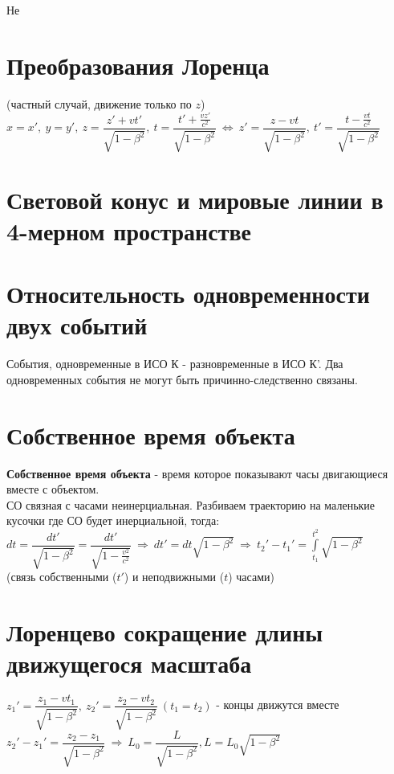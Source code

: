 \begin{multicols*}{2}
		Не
		
		\section{Преобразования Лоренца}
		
		(частный случай, движение только по $ z $) \\ 
		$ x=x',~ y=y',~ z=\dfrac{z'+vt'}{\sqrt{1-\beta^2}},~ t=\dfrac{t'+\frac{vz'}{c^2}}{\sqrt{1-\beta^2}}~\Leftrightarrow~ z'=\dfrac{z-vt}{\sqrt{1-\beta^2}},~ t'=\dfrac{t-\frac{vt}{c^2}}{\sqrt{1-\beta^2}} $
		
		\section{Световой конус и мировые линии в 4-мерном пространстве}
		
		\section{Относительность одновременности двух событий}
		
		События, одновременные в ИСО К - разновременные в ИСО К'. Два одновременных события не могут быть причинно-следственно связаны.
		
		\section{Собственное время объекта}
		
		\textbf{Собственное время объекта} - время которое показывают часы двигающиеся вместе с объектом. \\
		СО  связная с часами неинерциальная. Разбиваем траекторию на маленькие кусочки где СО будет инерциальной, тогда: \\
		$ dt=\dfrac{dt'}{\sqrt{1-\beta^2}} = \dfrac{dt'}{\sqrt{1-\frac{v^2}{c^2}}} ~\Rightarrow~ dt'=dt\sqrt{1-\beta^2} ~\Rightarrow~ t_2'-t_1' = \int\limits_{t_1}^{t^2}\sqrt{1-\beta^2} $ \\
		(связь собственными ($ t' $) и неподвижными ($ t  $) часами)
		
		\section{Лоренцево сокращение длины движущегося масштаба}
		
		$ z_1'= \dfrac{z_1-vt_1}{\sqrt{1-\beta^2}},~ z_2'= \dfrac{z_2-vt_2}{\sqrt{1-\beta^2}} ~ (t_1=t_2)$ - концы движутся вместе \\
		$ z_2'-z_1' = \dfrac{z_2-z_1}{\sqrt{1-\beta^2}} ~ \Rightarrow ~ L_0 = \dfrac{L}{\sqrt{1-\beta^2}}, L = L_0\sqrt{1-\beta^2} $
		

\end{multicols*}
